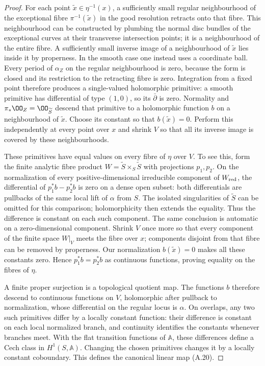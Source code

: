 \begin{proof}
For each point $\widetilde x\in\eta^{-1}(x)$, a sufficiently small regular neighbourhood of the exceptional fibre $\pi^{-1}(\widetilde x)$ in the good resolution retracts onto that fibre. This neighbourhood can be constructed by plumbing the normal disc bundles of the exceptional curves at their transverse intersection points; it is a neighbourhood of the entire fibre. A sufficiently small inverse image of a neighbourhood of $\widetilde x$ lies inside it by properness. In the smooth case one instead uses a coordinate ball. Every period of $\alpha_Z$ on the regular neighbourhood is zero, because the form is closed and its restriction to the retracting fibre is zero. Integration from a fixed point therefore produces a single-valued holomorphic primitive: a smooth primitive has differential of type $(1,0)$, so its $\bar\partial$ is zero. Normality and $\pi_*\OO_Z=\OO_{\widetilde S}$ descend that primitive to a holomorphic function $b$ on a neighbourhood of $\widetilde x$. Choose its constant so that $b(\widetilde x)=0$. Perform this independently at every point over $x$ and shrink $V$ so that all its inverse image is covered by these neighbourhoods.

These primitives have equal values on every fibre of $\eta$ over $V$. To see this, form the finite analytic fibre product
$W=\widetilde S\times_S\widetilde S$ with projections $p_1,p_2$. On the normalization of every positive-dimensional irreducible component of $W_{\rm red}$, the differential of $p_1^*b-p_2^*b$ is zero on a dense open subset: both differentials are pullbacks of the same local lift of $\alpha$ from $S$. The isolated singularities of $\widetilde S$ can be omitted for this comparison; holomorphicity then extends the equality. Thus the difference is constant on each such component. The same conclusion is automatic on a zero-dimensional component. Shrink $V$ once more so that every component of the finite space $W|_V$ meets the fibre over $x$; components disjoint from that fibre can be removed by properness. Our normalization $b(\widetilde x)=0$ makes all these constants zero. Hence $p_1^*b=p_2^*b$ as continuous functions, proving equality on the fibres of $\eta$.

A finite proper surjection is a topological quotient map. The functions $b$ therefore descend to continuous functions on $V$, holomorphic after pullback to normalization, whose differential on the regular locus is $\alpha$. On overlaps, any two such primitives differ by a locally constant function: their difference is constant on each local normalized branch, and continuity identifies the constants whenever branches meet. With the flat transition functions of $\mathbb A$, these differences define a Cech class in $H^1(S,\mathbb A)$. Changing the chosen primitives changes it by a locally constant coboundary. This defines the canonical linear map (A.20).


\end{proof}
